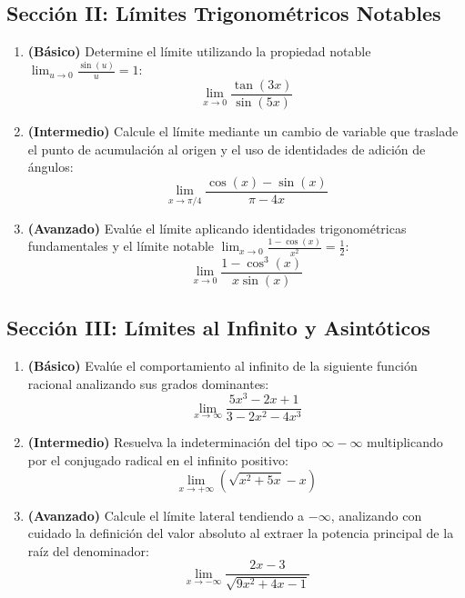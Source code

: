 \documentclass[11pt,letterpaper]{article}
\begin{document}
\subsection{Sección II: Límites Trigonométricos Notables}
\begin{enumerate}[label=\textbf{\arabic*.}, resume]
    \item \textbf{(Básico)} Determine el límite utilizando la propiedad notable $\lim_{u\to 0} \frac{\sin(u)}{u} = 1$:
    $$\lim_{x\to 0} \frac{\tan(3x)}{\sin(5x)}$$
    
    \item \textbf{(Intermedio)} Calcule el límite mediante un cambio de variable que traslade el punto de acumulación al origen y el uso de identidades de adición de ángulos:
    $$\lim_{x\to \pi/4} \frac{\cos(x) - \sin(x)}{\pi - 4x}$$
    
    \item \textbf{(Avanzado)} Evalúe el límite aplicando identidades trigonométricas fundamentales y el límite notable $\lim_{x\to 0} \frac{1-\cos(x)}{x^2} = \frac{1}{2}$:
    $$\lim_{x\to 0} \frac{1 - \cos^3(x)}{x\sin(x)}$$
\end{enumerate}

\subsection{Sección III: Límites al Infinito y Asintóticos}
\begin{enumerate}[label=\textbf{\arabic*.}, resume]
    \item \textbf{(Básico)} Evalúe el comportamiento al infinito de la siguiente función racional analizando sus grados dominantes:
    $$\lim_{x\to \infty} \frac{5x^3 - 2x + 1}{3 - 2x^2 - 4x^3}$$
    
    \item \textbf{(Intermedio)} Resuelva la indeterminación del tipo $\infty - \infty$ multiplicando por el conjugado radical en el infinito positivo:
    $$\lim_{x\to +\infty} \left( \sqrt{x^2 + 5x} - x \right)$$
    
    \item \textbf{(Avanzado)} Calcule el límite lateral tendiendo a $-\infty$, analizando con cuidado la definición del valor absoluto al extraer la potencia principal de la raíz del denominador:
    $$\lim_{x\to -\infty} \frac{2x - 3}{\sqrt{9x^2 + 4x - 1}}$$
\end{enumerate}
\end{document}
